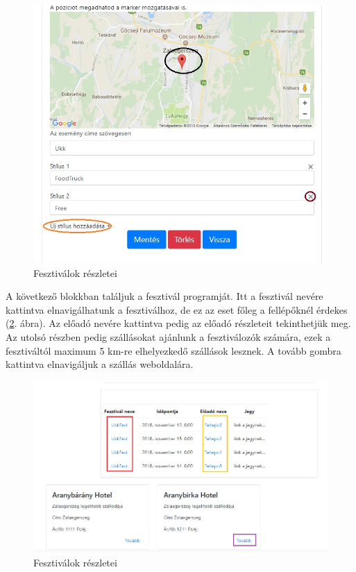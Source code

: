 \begin{figure}[h!]
\centering
\includegraphics[scale=0.64]{kepek/eventDet2.jpg}
\caption{Fesztiválok részletei}
\label{fig:event2Det}
\end{figure}

A következő blokkban találjuk a fesztivál programját. Itt a fesztivál nevére kattintva elnavigálhatunk a fesztiválhoz, de ez az eset főleg a fellépőknél érdekes (\ref{fig:event3Det}. ábra). Az előadó nevére kattintva pedig az előadó részleteit tekinthetjük meg. Az utolsó részben pedig szállásokat ajánlunk a fesztiválozók számára, ezek a fesztiváltól maximum 5 km-re elhelyezkedő szállások lesznek. A tovább gombra kattintva elnavigáljuk a szállás weboldalára.

\begin{figure}[h!]
\centering
\includegraphics[scale=0.64]{kepek/festFoot.jpg}
\caption{Fesztiválok részletei}
\label{fig:event3Det}
\end{figure}

